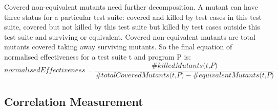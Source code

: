 Covered non-equivalent mutants need further decomposition. A mutant can have three status for a particular test suite: covered and killed by test cases in this test suite, covered but not killed by this test suite but killed by test cases outside this test suite and surviving or equivalent. Covered non-equivalent mutants are total mutants covered taking away surviving mutants. So the final equation of normalised effectiveness for a test suite t and program P is:
\[\textit{normalisedEffectiveness} = \frac{\#\textit{killedMutants(t,P)}}{\#\textit{totalCoveredMutants(t,P)} - \#\textit{equivalentMutants(t,P)}}\]
\subsection{Correlation Measurement}